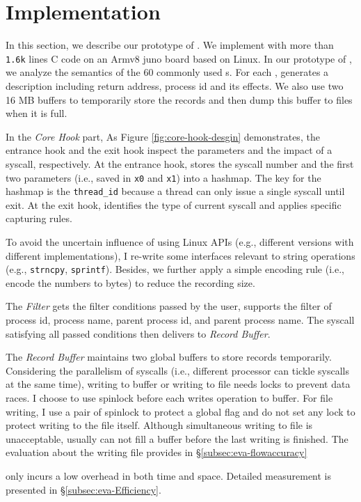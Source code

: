 \section{Implementation}

In this section, we describe our prototype of \TheName. We implement \TheName
with more than \texttt{1.6k} lines C code
on an Armv8 juno board based on Linux. In our prototype of \TheName, we analyze the semantics of the 60 commonly used
\syscall{}s. For each \syscall{}, \TheName generates a description including  return address, process id and its effects. We also use two 16 MB buffers to temporarily store
the \syscall{} records and then dump this buffer to files when it is full. 

In the \textit{Core Hook} part, As Figure \ref{fig:core-hook-desgin} demonstrates, the entrance hook and the exit hook inspect the parameters and the impact of a syscall, respectively. At the entrance hook, \TheName stores the syscall number and the first two parameters (i.e., saved in \texttt{x0} and \texttt{x1}) into a hashmap. The key for the hashmap is the \texttt{thread\_id} because a thread can only issue a single syscall until exit. At the exit hook, \TheName identifies the type of current syscall and applies specific capturing rules.

To avoid the uncertain influence of using Linux APIs (e.g., different versions with different implementations), I re-write some interfaces relevant to string operations (e.g., \texttt{strncpy}, \texttt{sprintf}). Besides, we further apply a simple encoding rule (i.e., encode the numbers to bytes) to reduce the recording size. 

The \textit{Filter} gets the filter conditions passed by the user, \TheName supports
the filter of process id, process name, parent process id, and parent process name. The syscall satisfying all passed conditions then delivers to \textit{Record Buffer}.

The \textit{Record Buffer} maintains two global buffers to store records temporarily. Considering the parallelism of syscalls (i.e., different processor can tickle syscalls at the same time), writing to buffer or writing to file needs locks to prevent data races. I choose to use spinlock before each writes operation to buffer. For file writing, I use a pair of spinlock to protect a global flag and do not set any lock to protect writing to the file itself. Although simultaneous writing to file is unacceptable, \TheName usually can not fill a buffer before the last writing is finished. The evaluation about the writing file provides in \S\ref{subsec:eva-flowaccuracy} 


\TheName only incurs a low overhead in both time and space. Detailed measurement is presented
in \S \ref{subsec:eva-Efficiency}.

